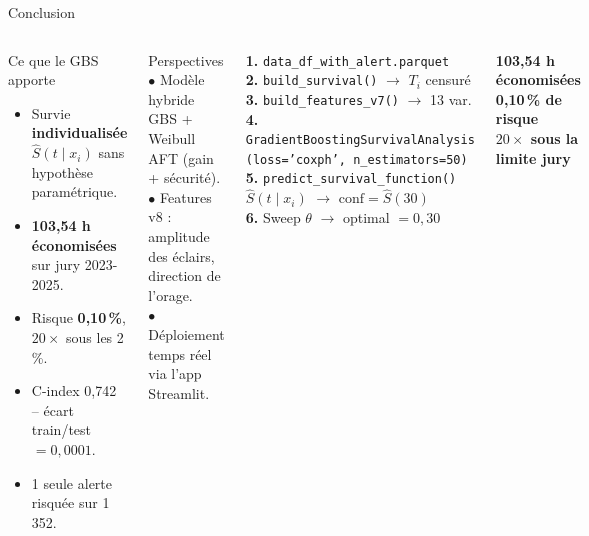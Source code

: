 \documentclass[aspectratio=169,t,11pt]{beamer}
\begin{document}
\begin{frame}{Conclusion}
\vspace{-2pt}
\begin{columns}[T]

\begin{exampleblock}{Ce que le GBS apporte}
\small
\begin{itemize}\setlength\itemsep{2pt}
  \item[\checkmark] Survie \textbf{individualisée} $\hat{S}(t \mid x_i)$ sans hypothèse paramétrique.
  \item[\checkmark] \textbf{103,54 h économisées} sur jury 2023-2025.
  \item[\checkmark] Risque \textbf{0,10\,\%}, $20\times$ sous les 2\,\%.
  \item[\checkmark] C-index 0,742 -- écart train/test $= 0{,}0001$.
  \item[\checkmark] 1 seule alerte risquée sur 1\,352.
\end{itemize}
\end{exampleblock}
\vspace{3pt}
\begin{alertblock}{Perspectives}
\footnotesize
$\bullet$ Modèle hybride GBS + Weibull AFT (gain + sécurité).\\
$\bullet$ Features v8 : amplitude des éclairs, direction de l'orage.\\
$\bullet$ Déploiement temps réel via l'app Streamlit.
\end{alertblock}

\begin{tcolorbox}[mybox,colback=metBlue!8,colframe=metBlue,
  title={Pipeline complet}]
\scriptsize
\textbf{1.} \texttt{data\_df\_with\_alert.parquet}\\
\textbf{2.} \texttt{build\_survival()} $\to$ $T_i$ censuré\\
\textbf{3.} \texttt{build\_features\_v7()} $\to$ 13 var.\\
\textbf{4.} \texttt{GradientBoostingSurvivalAnalysis}\\
\quad\texttt{(loss='coxph', n\_estimators=50)}\\
\textbf{5.} \texttt{predict\_survival\_function()}\\
\quad $\hat{S}(t\mid x_i)$ $\to$ $\mathrm{conf} = \hat{S}(30)$\\
\textbf{6.} Sweep $\theta$ $\to$ optimal $= 0{,}30$
\end{tcolorbox}
\vspace{3pt}
\begin{tcolorbox}[mybox,colback=metGreen!12,colframe=metGreen,
  halign=center,top=5pt,bottom=5pt]
\normalsize\bfseries\color{metGreen}
103,54 h économisées\\[2pt]
0,10\,\% de risque\\[1pt]
\small\normalfont\color{black}$20\times$ sous la limite jury
\end{tcolorbox}
\end{columns}
\end{frame}
\end{document}
